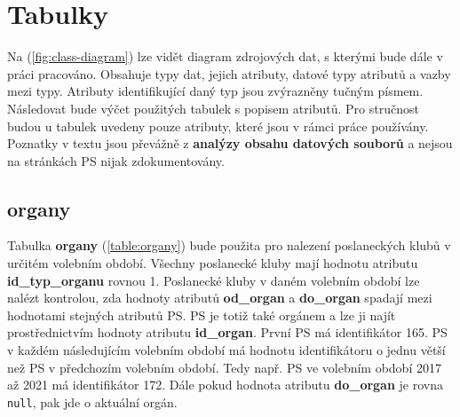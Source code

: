 \section{Tabulky}

Na (\ref{fig:class-diagram}) lze vidět diagram zdrojových dat, s kterými bude dále v práci pracováno. Obsahuje typy dat, jejich atributy, datové typy atributů a vazby mezi typy. Atributy identifikující daný typ jsou zvýrazněny tučným písmem. Následovat bude výčet použitých tabulek s popisem atributů. Pro stručnost budou u tabulek uvedeny pouze atributy, které jsou v rámci práce používány. Poznatky v textu jsou převážně z \textbf{analýzy obsahu datových souborů} a nejsou na stránkách PS nijak zdokumentovány.

\subsection*{organy}
Tabulka \textbf{organy} (\ref{table:organy}) bude použita pro nalezení poslaneckých klubů v určitém volebním období. Všechny poslanecké kluby mají hodnotu atributu \textbf{id\_typ\_organu} rovnou 1. Poslanecké kluby v daném volebním období lze nalézt kontrolou, zda hodnoty atributů \textbf{od\_organ} a \textbf{do\_organ} spadají mezi hodnotami stejných atributů PS. PS je totiž také orgánem a lze ji najít prostřednictvím hodnoty atributu \textbf{id\_organ}. První PS má identifikátor 165. PS v každém následujícím volebním období má hodnotu identifikátoru o jednu větší než PS v předchozím volebním období. Tedy např. PS ve volebním období 2017 až 2021 má identifikátor 172. Dále pokud hodnota atributu \textbf{do\_organ} je rovna \lstinline|null|, pak jde o aktuální orgán.

